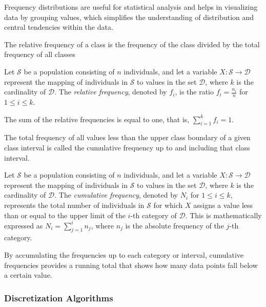 Frequency distributions are useful for statistical analysis and helps in visualizing data by grouping values, which simplifies the understanding of distribution and central tendencies within the data.

The relative frequency of a class is the frequency of the class divided by the total frequency of all classes

\begin{definition}
Let $\mathcal{S}$ be a population consisting of $n$ individuals, and let a variable $X: \mathcal{S} \rightarrow \mathcal{D}$ represent the mapping of individuals in $\mathcal{S}$ to values in the set $\mathcal{D}$, where $k$ is the cardinality of $\mathcal{D}$. The \emph{relative frequency}, denoted by $f_i$, is the ratio $f_i = \frac{n_i}{n}$ for $1 \leq i \leq k$.
\end{definition}

The sum of the relative frequencies is equal to one, that is, $\sum_{i=1}^k f_i = 1$.

The total frequency of all values less than the upper class boundary of a given class interval is called the cumulative frequency up to and including that class interval.

\begin{definition}
Let $\mathcal{S}$ be a population consisting of $n$ individuals, and let a variable $X: \mathcal{S} \rightarrow \mathcal{D}$ represent the mapping of individuals in $\mathcal{S}$ to values in the set $\mathcal{D}$, where $k$ is the cardinality of $\mathcal{D}$. The \emph{cumulative frequency}, denoted by $N_i$ for $1 \leq i \leq k$, represents the total number of individuals in $\mathcal{S}$ for which $X$ assigns a value less than or equal to the upper limit of the $i$-th category of $\mathcal{D}$. This is mathematically expressed as $N_i = \sum_{j=1}^i n_j$, where $n_j$ is the absolute frequency of the $j$-th category.
\end{definition}

By accumulating the frequencies up to each category or interval, cumulative frequencies provides a running total that shows how many data points fall below a certain value.

\subsubsection*{Discretization Algorithms}

